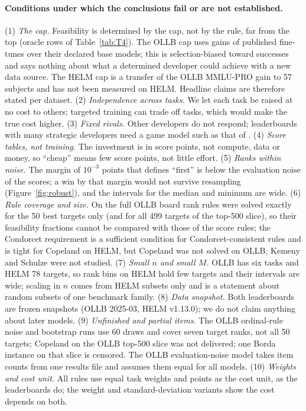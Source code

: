 \documentclass{article}
\begin{document}
\paragraph{Conditions under which the conclusions fail or are not established.}
(1) \emph{The cap.} Feasibility is determined by the cap, not by the rule, far from the top (oracle rows of Table~\ref{tab:T4}). The OLLB cap uses gains of published fine-tunes over their declared base models; this is selection-biased toward successes and says nothing about what a determined developer could achieve with a new data source. The HELM cap is a transfer of the OLLB MMLU-PRO gain to 57 subjects and has not been measured on HELM. Headline claims are therefore stated per dataset. (2) \emph{Independence across tasks.} We let each task be raised at no cost to others; targeted training can trade off tasks, which would make the true cost higher. (3) \emph{Fixed rivals.} Other developers do not respond; leaderboards with many strategic developers need a game model such as that of \citet{chen2026incentives}. (4) \emph{Score tables, not training.} The investment is in score points, not compute, data or money, so ``cheap'' means few score points, not little effort. (5) \emph{Ranks within noise.} The margin of $10^{-3}$ points that defines ``first'' is below the evaluation noise of the scores; a win by that margin would not survive resampling (Figure~\ref{fig:robust}), and the intervals for the median and minimum are wide. (6) \emph{Rule coverage and size.} On the full OLLB board rank rules were solved exactly for the 50 best targets only (and for all 499 targets of the top-500 slice), so their feasibility fractions cannot be compared with those of the score rules; the Condorcet requirement is a sufficient condition for Condorcet-consistent rules and is tight for Copeland on HELM, but Copeland was not solved on OLLB; Kemeny and Schulze were not studied. (7) \emph{Small $n$ and small $M$.} OLLB has six tasks and HELM 78 targets, so rank bins on HELM hold few targets and their intervals are wide; scaling in $n$ comes from HELM subsets only and is a statement about random subsets of one benchmark family. (8) \emph{Data snapshot.} Both leaderboards are frozen snapshots (OLLB 2025-03, HELM v1.13.0); we do not claim anything about later models. (9) \emph{Unfinished and partial items.} The OLLB ordinal-rule noise and bootstrap runs use 60 draws and cover seven target ranks, not all 50 targets; Copeland on the OLLB top-500 slice was not delivered; one Borda instance on that slice is censored. The OLLB evaluation-noise model takes item counts from one results file and assumes them equal for all models. (10) \emph{Weights and cost unit.} All rules use equal task weights and points as the cost unit, as the leaderboards do; the weight and standard-deviation variants show the cost depends on both.
\end{document}
